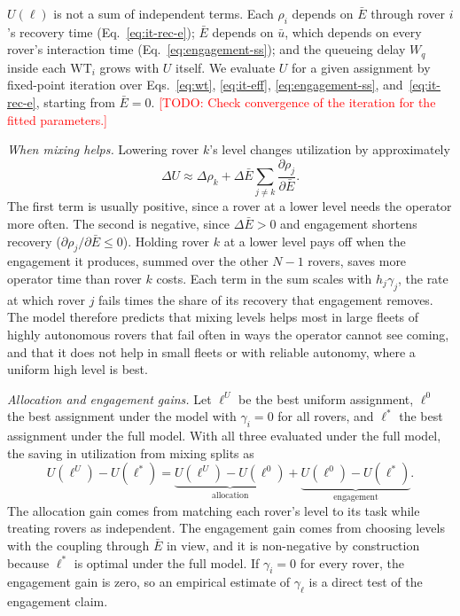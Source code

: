 \documentclass[conference]{IEEEtran}
\newcommand{\todo}[1]{\textcolor{red}{[TODO: #1]}}
\begin{document}
$U(\boldsymbol{\ell})$ is not a sum of independent terms. Each
$\rho_i$ depends on $\bar{E}$ through rover $i$'s recovery time
(Eq.~\eqref{eq:it-rec-e}); $\bar{E}$ depends on $\bar{u}$, which
depends on every rover's interaction time
(Eq.~\eqref{eq:engagement-ss}); and the queueing delay $W_q$ inside
each $\mathrm{WT}_i$ grows with $U$ itself. We evaluate $U$ for a
given assignment by fixed-point iteration over
Eqs.~\eqref{eq:wt}, \eqref{eq:it-eff}, \eqref{eq:engagement-ss},
and~\eqref{eq:it-rec-e}, starting from $\bar{E} = 0$.
\todo{Check convergence of the iteration for the fitted parameters.}

\emph{When mixing helps.} Lowering rover $k$'s level changes
utilization by approximately
\begin{equation}
  \Delta U \approx \Delta \rho_k
  + \Delta \bar{E} \sum_{j \ne k} \frac{\partial \rho_j}{\partial \bar{E}} .
  \label{eq:mix-condition}
\end{equation}
The first term is usually positive, since a rover at a lower level
needs the operator more often. The second is negative, since
$\Delta \bar{E} > 0$ and engagement shortens recovery
($\partial \rho_j / \partial \bar{E} \le 0$). Holding rover $k$ at a
lower level pays off when the engagement it produces, summed over the
other $N-1$ rovers, saves more operator time than rover $k$ costs.
Each term in the sum scales with $h_j \gamma_j$, the rate at which
rover $j$ fails times the share of its recovery that engagement
removes. The model therefore predicts that mixing levels helps most in
large fleets of highly autonomous rovers that fail often in ways the
operator cannot see coming, and that it does not help in small fleets
or with reliable autonomy, where a uniform high level is best.

\emph{Allocation and engagement gains.} Let $\boldsymbol{\ell}^{U}$ be
the best uniform assignment, $\boldsymbol{\ell}^{0}$ the best
assignment under the model with $\gamma_i = 0$ for all rovers, and
$\boldsymbol{\ell}^{*}$ the best assignment under the full model. With
all three evaluated under the full model, the saving in utilization
from mixing splits as
\begin{equation}
  U(\boldsymbol{\ell}^{U}) - U(\boldsymbol{\ell}^{*}) =
  \underbrace{U(\boldsymbol{\ell}^{U}) - U(\boldsymbol{\ell}^{0})}_{\text{allocation}}
  + \underbrace{U(\boldsymbol{\ell}^{0}) - U(\boldsymbol{\ell}^{*})}_{\text{engagement}} .
  \label{eq:decomposition}
\end{equation}
The allocation gain comes from matching each rover's level to its
task while treating rovers as independent. The engagement gain comes
from choosing levels with the coupling through $\bar{E}$ in view, and
it is non-negative by construction because $\boldsymbol{\ell}^{*}$ is
optimal under the full model. If $\gamma_i = 0$ for every rover, the
engagement gain is zero, so an empirical estimate of $\gamma_\ell$ is
a direct test of the engagement claim.
\end{document}
